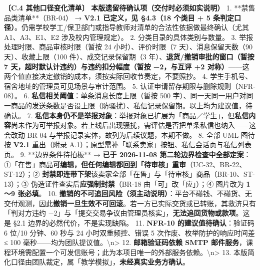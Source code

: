 \documentclass[12pt,a4paper]{ctexart}
\begin{document}
{\small\textbf{〔C.4 其他口径变化清单〕} \textbf{本版遗留待确认项（交付时必须如实说明）} 1. **禁售品类清单**（BR-04） → \textbf{V2.1 已定义，见 §4.3（18 个类目 + 5 条判定口径）}。仍需学校学工/保卫部门或指导教师对清单的合法性依据做最终确认（尤其 A1、A3、E1、E2 涉及校内管理规定）。 2. 分类目录的具体类别与数量。 3. 举报处理时限、商品审核时限（暂按 24 小时）、评价时限（7 天）、消息保留天数（90 天）、收藏上限（100 件）、成交记录保留期（3 年）、\textbf{退货/撤销审批的窗口（暂按 7 天，超时默认计违约）与违约扣分幅度（暂按 −2，与互评 +2 对称）}——这两个值直接决定撤销的成本，须按实际回收节奏定，不要照抄。 4. 学生手机号、宿舍地址的管理员可见场景与审计范围。 5. 认证申请留存期限与删除规则（NFR-08）。 6. \textbf{私信相关阈值}：单条消息长度上限（暂按 500 字）、同一天同一用户对同一商品的发送条数是否设上限（防骚扰）、私信记录保留期。以上均为建议值，待确认。 7. \textbf{私信本身仍不是举报对象}：举报对象已扩展为「商品／学生」，但\textbf{私信内容}尚未作为可举报对象。若上线后出现骚扰，需评估是否把单条私信也纳入——这会改动 BR-04 与举报记录实体，故列为后续议题，本期不做。 8. 全部 UML 图待按 \textbf{V2.1} 重出（附录 A.1）；原型需补「联系卖家」按钮、私信会话页与私信列表页。 9. **边界条件待拍板** → \textbf{已于 2026-11-08 第二轮边界检查中全部定案}：①「在售」商品\textbf{可编辑，但任何编辑都回到「待审核」重审}（UC-32、BR-22、ST-12）；② \textbf{封禁即连带下架}该卖家全部「在售」与「待审核」商品（BR-10、ST-13）；③ 伪造证件查实后\textbf{应强制封禁}（BR-18 由「可」改「应」）；④ 图片改为 \textbf{1～9 张必填}。 10. \textbf{撤销的不可追回风险（须主动说明）}：平台不碰钱、不碰货、无交付观测，因此\textbf{撤销一旦生效不可回滚}。若一方已实际交货或已转账，其救济只有「判对方违约 −2」与「提交交易争议由管理员核实」，\textbf{无法追回货物或款项}。这是 §2.1 边界的必然代价，不是实现缺陷。 11. \textbf{NFR-10 的建议值待确认}：验证码 6 位/10 分钟、60 秒与 24 小时双重频控、错误 5 次作废、枚举防护的响应时间差 ≤ 100 毫秒——均为团队提议值。\textbackslash{}n> 12. \textbf{邮箱验证码依赖 SMTP 邮件服务}，课程环境需配置一个可发信账号；此为本项目唯一的外部服务依赖。\textbackslash{}n> 13. 本版简化口径由团队裁定，属「教学模拟」，\textbf{未经真实业务方确认}。}\par
\vspace{0.35em}
\end{document}
